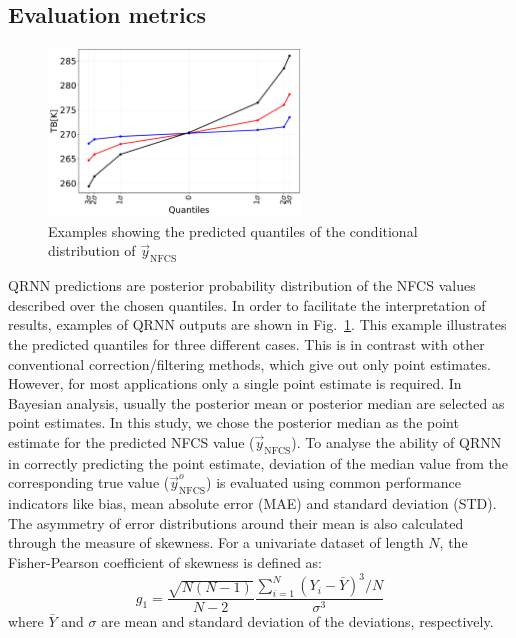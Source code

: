 \documentclass[amt, manuscript]{copernicus}
\newcommand{\ynfcs}{\vec{y}_\text{NFCS}}
\newcommand{\yonfcs}{\vec{y}^{o}_\text{NFCS}}
\begin{document}
\subsection{Evaluation metrics}
\label{sec:validation}
\begin{figure}[t]
	\centering
	\includegraphics[height=45mm]{Figures/posterior_distribution_I1V.pdf} 
	\caption{Examples showing the predicted quantiles of the conditional distribution of $\ynfcs$ }
	\label{fig:posterior_distribution_I1V}	
\end{figure}
QRNN predictions are posterior probability distribution of the NFCS values
described over the chosen quantiles. In order to facilitate the interpretation
of results, examples of QRNN outputs are shown in
Fig.~\ref{fig:posterior_distribution_I1V}. This example illustrates the
predicted quantiles for three different cases. This is in contrast with other
conventional correction/filtering methods, which give out only point estimates.
However, for most applications only a single point estimate is required. In
Bayesian analysis, usually the posterior mean or posterior median are selected
as point estimates. In this study, we chose the posterior median as the point
estimate for the predicted NFCS value ($\ynfcs$). To analyse the ability of QRNN
in correctly predicting the point estimate, deviation of the median value from
the corresponding true value ($\yonfcs$) is evaluated using common performance
indicators like bias, mean absolute error (MAE) and standard deviation (STD).
The asymmetry of error distributions around their mean is also calculated
through the measure of skewness. For a univariate dataset of length $N$, the
Fisher-Pearson coefficient of skewness is defined as:
\begin{equation}
g_1 = 	\frac{\sqrt{N(N-1)}}{N-2} \frac{\sum_{i = 1}^{N}(Y_i - \bar{Y})^3/N}{\sigma^3}
\end{equation}
where $\bar{Y}$ and $\sigma$ are mean and standard deviation of the deviations, respectively.
\end{document}
